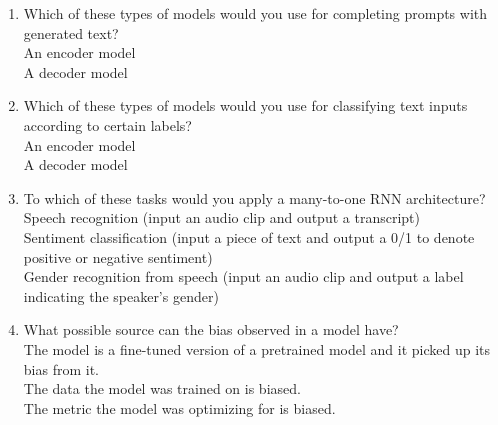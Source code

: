 \begin{enumerate}
    
    \item Which of these types of models would you use for completing prompts with generated text? \\ 
        \hspace{1cm}\choice{} An encoder model \\ 
        \hspace{1cm}\checkmark{} A decoder model \\ 
        \solution{}
    \item Which of these types of models would you use for classifying text inputs according to certain labels? \\ 
        \hspace{1cm}\checkmark{} An encoder model \\ 
        \hspace{1cm}\choice{} A decoder model \\ 
        \solution{}
    \item To which of these tasks would you apply a many-to-one RNN architecture? \\ 
        \hspace{1cm}\choice{} Speech recognition (input an audio clip and output a transcript) \\ 
        \hspace{1cm}\checkmark{} Sentiment classification (input a piece of text and output a 0/1 to denote positive or negative sentiment) \\ 
        \hspace{1cm}\checkmark{} Gender recognition from speech (input an audio clip and output a label indicating the speaker’s gender) \\ 
        \solution{}
    \item What possible source can the bias observed in a model have?  \\ 
        \hspace{1cm}\checkmark{} The model is a fine-tuned version of a pretrained model and it picked up its bias from it. \\ 
        \hspace{1cm}\checkmark{} The data the model was trained on is biased. \\ 
        \hspace{1cm}\checkmark{} The metric the model was optimizing for is biased. \\ 
        \solution{}
    

\end{enumerate}
